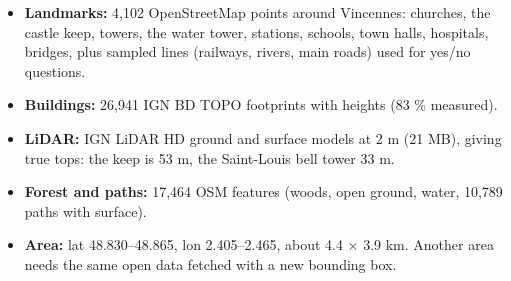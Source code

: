 \begin{itemize}
  \item \textbf{Landmarks:} 4,102 OpenStreetMap points around Vincennes: churches, the castle keep, towers, the
        water tower, stations, schools, town halls, hospitals, bridges, plus sampled lines (railways, rivers,
        main roads) used for yes/no questions.
  \item \textbf{Buildings:} 26,941 IGN BD TOPO footprints with heights (83 \% measured).
  \item \textbf{LiDAR:} IGN LiDAR HD ground and surface models at 2 m (21 MB), giving true tops: the keep is
        53 m, the Saint-Louis bell tower 33 m.
  \item \textbf{Forest and paths:} 17,464 OSM features (woods, open ground, water, 10,789 paths with surface).
  \item \textbf{Area:} lat 48.830--48.865, lon 2.405--2.465, about 4.4 $\times$ 3.9 km. Another area needs the
        same open data fetched with a new bounding box.
\end{itemize}
